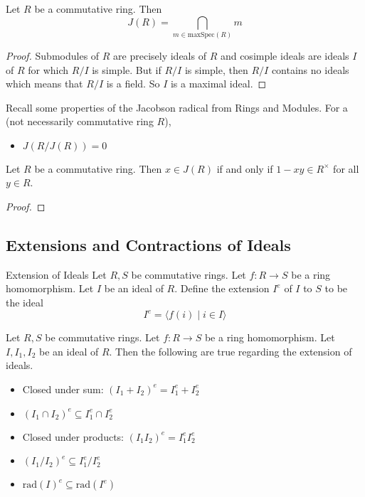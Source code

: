 \documentclass[a4paper]{article}
\begin{document}
\begin{prp}{}{} Let $R$ be a commutative ring. Then $$J(R)=\bigcap_{m\in\text{maxSpec}(R)}m$$ \tcbline
\begin{proof}
Submodules of $R$ are precisely ideals of $R$ and cosimple ideals are ideals $I$ of $R$ for which $R/I$ is simple. But if $R/I$ is simple, then $R/I$ contains no ideals which means that $R/I$ is a field. So $I$ is a maximal ideal. 
\end{proof}
\end{prp}

Recall some properties of the Jacobson radical from Rings and Modules. For a (not necessarily commutative ring $R$), 
\begin{itemize}
\item $J(R/J(R))=0$
\end{itemize}

\begin{prp}{}{} Let $R$ be a commutative ring. Then $x\in J(R)$ if and only if $1-xy\in R^\times$ for all $y\in R$. \tcbline
\begin{proof}
\end{proof}
\end{prp}

\subsection{Extensions and Contractions of Ideals}
\begin{defn}{Extension of Ideals}{} Let $R,S$ be commutative rings. Let $f:R\to S$ be a ring homomorphism. Let $I$ be an ideal of $R$. Define the extension $I^e$ of $I$ to $S$ to be the ideal $$I^e=\langle f(i)\;|\;i\in I\rangle$$
\end{defn}

\begin{prp}{}{} Let $R,S$ be commutative rings. Let $f:R\to S$ be a ring homomorphism. Let $I,I_1,I_2$ be an ideal of $R$. Then the following are true regarding the extension of ideals. 
\begin{itemize}
\item Closed under sum: $(I_1+I_2)^e=I_1^e+I_2^e$
\item $(I_1\cap I_2)^e\subseteq I_1^e\cap I_2^e$
\item Closed under products: $(I_1I_2)^e=I_1^eI_2^e$
\item $(I_1/I_2)^e\subseteq I_1^e/I_2^e$
\item $\text{rad}(I)^e\subseteq\text{rad}(I^e)$
\end{itemize}
\end{prp}
\end{document}
